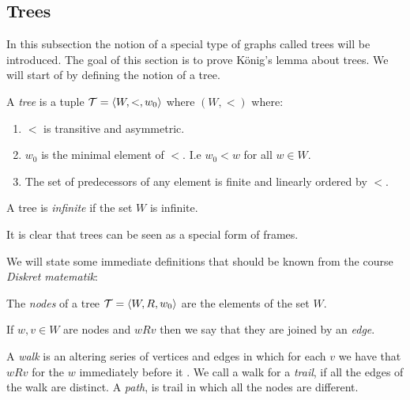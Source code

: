 \documentclass[../main.tex]{subfiles}
\begin{document}
\subsection{Trees}
In this subsection the notion of a special type of graphs called trees will be
introduced. The goal of this section is to prove König's lemma about trees. We
will start of by defining the notion of a tree.
\begin{defi}
	A \textit{tree} is a tuple $\mathcal{T}=\langle W,<,w_0\rangle$ where $(W,<)$ where:
	\begin{enumerate}
		\item $<$ is transitive and asymmetric.
		\item $w_0$ is the minimal element of $<$. I.e $w_0
			<w$ for all $w\in W$.
		\item The set of predecessors of any element is finite and
			linearly ordered by $<$.
	\end{enumerate}
	A tree is \textit{infinite} if the set $W$ is infinite.
\end{defi}

It is clear that trees can be seen as a special form of frames.

We will state some immediate definitions that should be known from the course
\textit{Diskret matematik}:
\begin{defi}
	The \textit{nodes} of a tree $\mathcal{T}=\langle W,R,w_0\rangle$ are the
	elements of the set $W$.

	If $w,v\in W$ are nodes and  $wRv$ then we say that they are joined  by an \textit{edge}.


	A \textit{walk} is an altering series of vertices and edges in
	which for each $v$ we have that $wRv$ for the $w$ immediately before it 
	. We call a walk for a \textit{trail}, if all the edges of
	the walk are distinct. A \textit{path}, is trail in which all the
	nodes are different.
\end{defi}
\end{document}
